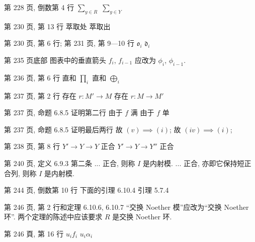 \documentclass{AJerrata}
\begin{document}
\begin{Errata}
        \item[第 228 页, 倒数第 4 行]
        \Orig $\sum_{y \in R}$
        \Corr $\sum_{y \in Y}$
        
        \item[第 230 页, 第 13 行]
        \Orig 萃取处
        \Corr 萃取出
        
		\item[第 230 页, 第 6 行; 第 231 页, 第 9---10 行]
		\Orig $\mathfrak{o}_i$
		\Corr $\mathfrak{d}_i$
        
        \item[第 235 页底部]
        图表中的垂直箭头 $f_i$, $f_{i-1}$ 应改为 $\phi_i$, $\phi_{i-1}$.
        
        \item[第 236 页, 第 6 行]
        \Orig 直和 $\prod_i$
        \Corr 直和 $\bigoplus_i$
        
        \item[第 237 页, 第 2 行]
        \Orig 存在 $r: M' \to M$
        \Corr 存在 $r: M \to M'$
        
        \item[第 237 页, 命题 6.8.5 证明第二行]
        \Orig 由于 $f$ 满
        \Corr 由于 $f$ 单
        
        \item[第 237 页, 命题 6.8.5 证明最后两行]
        \Orig 故 $(v) \implies (i)$;
        \Corr 故 $(iv) \implies (i)$;
        
        \item[第 238 页, 第 8 行]
        \Orig $Y' \to Y \to Y$ 正合
        \Corr $Y' \to Y \to Y''$ 正合
        
       \item[第 240 页, 定义 6.9.3 第二条]
       \Orig ... 正合, 则称 $I$ 是内射模.
       \Corr ... 正合, 亦即它保持短正合列, 则称 $I$ 是内射模.
        
   		\item[第 244 页, 倒数第 10 行]
        \Orig 下面的引理 6.10.4
        \Corr 引理 5.7.4
        
   		\item[第 246 页, 第 2 行和定理 6.10.6, 6.10.7]
		``交换 Noether 模''应改为``交换 Noether 环''. 两个定理的陈述中应该要求 $R$ 是交换 Noether 环.
        
        \item[第 246 頁, 第 16 行]
        \Orig $u_i f_i$
        \Corr $u_i \alpha_i$
        

\end{Errata}
\end{document}
